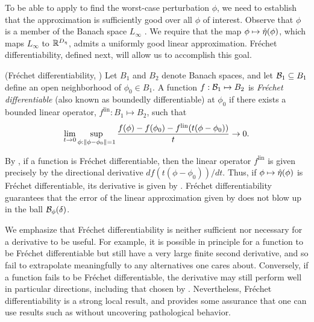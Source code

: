 To be able to apply  to find the worst-case
perturbation $\phi$, we need to establish that the approximation is sufficiently
good over all $\phi$ of interest. Observe that $\phi$ is a member of the Banach
space $L_\infty$ \citep[Theorem 5.2.1]{dudley:2018:real}.  We require that the
map $\phi \mapsto \hat\eta(\phi)$, which maps $L_\infty$ to $\mathbb{R}^{D_{\eta}}$,
admits a uniformly good linear approximation. Fr{\'e}chet differentiability,
defined next, will allow us to accomplish this goal.

\begin{defn}
    (Fr{\'e}chet differentiability,
    \citep[Definition 4.5]{zeidler:2013:functional})
%
Let $B_1$ and $B_2$ denote Banach spaces, and let $\mathcal{B}_1 \subseteq B_1$ define
an open neighborhood of $\phi_0 \in B_1$.
%
A function $f: \mathcal{B}_1 \mapsto B_2$ is {\em Fr{\'echet} differentiable} (also
known as boundedly differentiable) at $\phi_0$ if there exists a  bounded linear
operator, $f^{\mathrm{lin}}: B_1 \mapsto B_2$, such that
%
\begin{align*}
%
\lim_{t \rightarrow 0}
    \sup_{\phi: \norm{\phi - \phi_0} = 1}
    \frac{f(\phi) - f(\phi_0) -
          f^{\mathrm{lin}}(t (\phi - \phi_0))
         }{t} \rightarrow 0.
%
\end{align*}
%
\end{defn}

By \citep[Proposition 4.8]{zeidler:2013:functional}, if a function is
Fr{\'e}chet differentiable, then the linear operator $f^{\mathrm{lin}}$ is given
precisely by the directional derivative $d f(t (\phi - \phi_0)) / d t$. Thus, if
$\phi \mapsto \hat\eta(\phi)$ is Fr{\'e}chet differentiable, its derivative is
given by .  Fr{\'e}chet differentiability guarantees
that the error of the linear approximation given by 
does not blow up in the ball $\mathcal{B}_\phi(\delta)$.

We emphasize that Fr{\'e}chet differentiability is neither sufficient nor
necessary for a derivative to be useful.  For example, it is possible in
principle for a function to be Fr{\'e}chet differentiable but still have a very
large finite second derivative, and so fail to extrapolate meaningfully to any
alternatives one cares about.  Conversely, if a function fails to be Fr{\'e}chet
differentiable, the derivative may still perform well in particular directions,
including that chosen by .  Nevertheless, Fr{\'e}chet
differentiability is a strong local result, and provides some assurance that one
can use results such as  without uncovering
pathological behavior.

